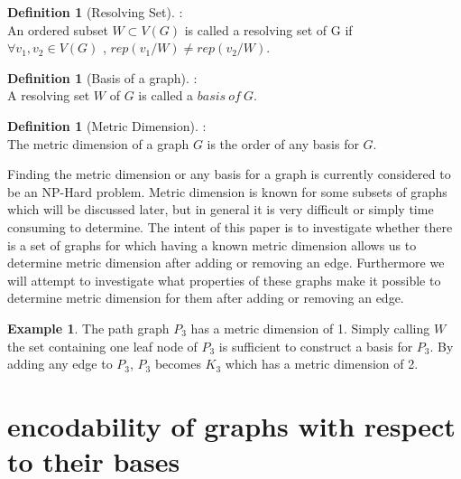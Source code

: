 \documentclass[11pt]{amsart}
\theoremstyle{plain}  %
\theoremstyle{definition}
\newtheorem{defin}[thm]{{Definition}}
\newtheorem{ex}[thm]{Example}
\theoremstyle{remark}
\numberwithin{equation}{thm}
\begin{document}
 \begin{defin}[Resolving Set]:\\
  An ordered subset $W \subset V(G)$ is called a resolving set of G if\\ $\forall v_1, v_2 \in V(G)$  , $rep(v_1/W) \neq  rep(v_2/W)$.
 \end{defin}
 
 \begin{defin}[Basis of a graph]:\\
  A resolving set $W$ of $G$ is called a $basis\ of\ G$.
 \end{defin}
 
 \begin{defin}[Metric Dimension]:\\
  The metric dimension of a graph $G$ is the order of any basis for $G$.
 \end{defin}


Finding the metric dimension or any basis for a graph is currently considered to be an NP-Hard problem. 
Metric dimension is known for some subsets of graphs which will be discussed later, but in general it is very difficult or simply time consuming to determine.
The intent of this paper is to investigate whether there is a set of graphs for which having a known metric dimension allows us to determine metric dimension after adding or removing an edge.
Furthermore we will attempt to investigate what properties of these graphs make it possible to determine metric dimension for them after adding or removing an edge.
\begin{ex}
 The path graph $P_3$ has a metric dimension of 1. Simply calling $W$ the set containing one leaf node of $P_3$ is sufficient to construct a basis for $P_3$.
 By adding any edge to $P_3$, $P_3$ becomes $K_3$ which has a metric dimension of 2.
\end{ex}

\section{encodability of graphs with respect to their bases}
\end{document}
